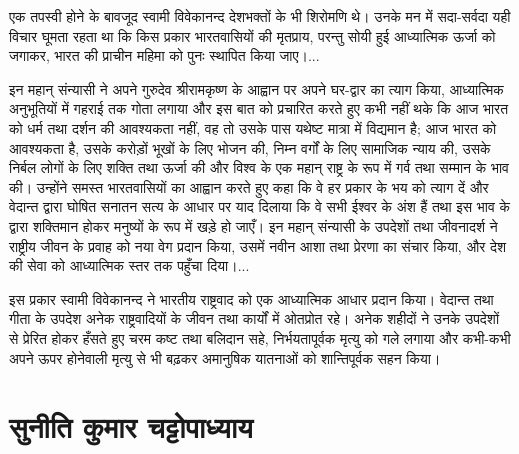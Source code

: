 \newpage

एक तपस्वी होने के बावजूद स्वामी विवेकानन्द देशभक्तों के भी शिरोमणि थे। उनके मन में सदा-सर्वदा यही विचार घूमता रहता था कि किस प्रकार भारतवासियों की मृतप्राय, परन्तु सोयी हुई आध्यात्मिक ऊर्जा को जगाकर, भारत की प्राचीन महिमा को पुनः स्थापित किया जाए।... 

इन महान् संन्यासी ने अपने गुरुदेव श्रीरामकृष्ण के आह्वान पर अपने घर-द्वार का त्याग किया, आध्यात्मिक अनुभूतियों में गहराई तक गोता लगाया और इस बात को प्रचारित करते हुए कभी नहीं थके कि आज भारत को धर्म तथा दर्शन की आवश्यकता नहीं, वह तो उसके पास यथेष्ट मात्रा में विद्यमान है; आज भारत को आवश्यकता है, उसके करोड़ों भूखों के लिए भोजन की, निम्न वर्गों के लिए सामाजिक न्याय की, उसके निर्बल लोगों के लिए शक्ति तथा ऊर्जा की और विश्व के एक महान् राष्ट्र के रूप में गर्व तथा सम्मान के भाव की। उन्होंने समस्त भारतवासियों का आह्वान करते हुए कहा कि वे हर प्रकार के भय को त्याग दें और वेदान्त द्वारा घोषित सनातन सत्य के आधार पर याद दिलाया कि वे सभी ईश्वर के अंश हैं तथा इस भाव के द्वारा शक्तिमान होकर मनुष्यों के रूप में खड़े हो जाएँ। इन महान् संन्यासी के उपदेशों तथा जीवनादर्श ने राष्ट्रीय जीवन के प्रवाह को नया वेग प्रदान किया, उसमें नवीन आशा तथा प्रेरणा का संचार किया, और देश की सेवा को आध्यात्मिक स्तर तक पहुँचा दिया।... 

इस प्रकार स्वामी विवेकानन्द ने भारतीय राष्ट्रवाद को एक आध्यात्मिक आधार प्रदान किया। वेदान्त तथा गीता के उपदेश अनेक राष्ट्रवादियों के जीवन तथा कार्यों में ओतप्रोत रहे। अनेक शहीदों ने उनके उपदेशों से प्रेरित होकर हँसते हुए चरम कष्ट तथा बलिदान सहे, निर्भयतापूर्वक मृत्यु को गले लगाया और कभी-कभी अपने ऊपर होनेवाली मृत्यु से भी बढ़कर अमानुषिक यातनाओं को शान्तिपूर्वक सहन किया।


\section*{सुनीति कुमार चट्टोपाध्याय}


